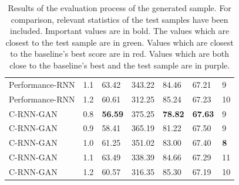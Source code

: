 \documentclass[a4paper]{book}
\begin{document}
\begin{landscape}
\begin{table}[t]
\begin{tabular}{l|l|l|l|l|l|l}
Performance-RNN   & 1.1         & 63.42          & 343.22          & 84.46          & 67.21            & 9       \\
Performance-RNN   & 1.2         & 60.61          & 312.25          & 85.24          & 67.23            & 10      \\
C-RNN-GAN         & 0.8         & \textbf{\color{base0E}56.59}    & 375.25          & \textbf{\color{base0A}78.82}    & \textbf{\color{base0A}67.63}      & 9       \\
C-RNN-GAN         & 0.9         & 58.41          & 365.19          & 81.22          & 67.50            & 9       \\
C-RNN-GAN         & 1.0         & 61.25          & 351.02          & 83.00          & 67.40            & \textbf{\color{base0A}8}       \\
C-RNN-GAN         & 1.1         & 63.49          & 338.39          & 84.66          & 67.29            & 11      \\
C-RNN-GAN         & 1.2         & 60.57          & 316.35          & 85.30          & 67.19            & 10     
\end{tabular}
\caption{Results of the evaluation process of the generated sample. For comparison, relevant statistics of the test samples have been included. Important values are in bold. The values which are closest to the test sample are in green. Values which are closest to the baseline's best score are in red. Values which are both close to the baseline's best and the test sample are in purple.}
\label{tab:results}
\end{table}
\end{landscape}
\end{document}
